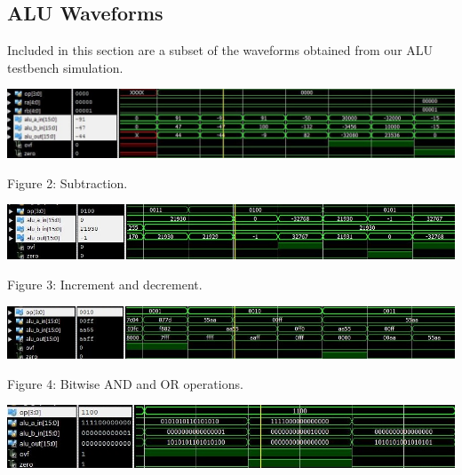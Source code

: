 \documentclass[11pt]{article}
\begin{document}
\subsection{ALU Waveforms}
Included in this section are a subset of the waveforms obtained from our ALU testbench simulation. \\

{\centering
\includegraphics[scale=0.75]{fig2.jpg} \newline \par
}

\hspace*{\fill}
Figure 2: Subtraction.
\hspace*{\fill}\newline

{\centering
\includegraphics[scale=0.75]{fig3.jpg} \newline \par
}


\hspace*{\fill}
Figure 3: Increment and decrement.
\hspace*{\fill}\newline

{\centering
\includegraphics[scale=0.75]{fig4.jpg} \newline \par
}

\hspace*{\fill}
Figure 4: Bitwise AND and OR operations.
\hspace*{\fill}\newline

{\centering
\includegraphics[scale=0.75]{fig5.jpg} \newline \par
}
\end{document}

